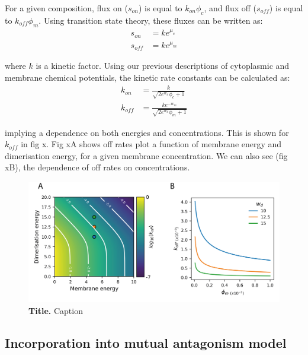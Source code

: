 \documentclass[12pt]{"report"}
\newcommand{\mycaption}[2]{\caption[#1]{\textbf{#1.} #2}}
\begin{document}
\begin{center}
\end{center}

For a given composition, flux on ($s_{on}$) is equal to $k_{on}\phi_c$, and flux off ($s_{off}$) is equal to $k_{off}\phi_m$. Using transition state theory, these fluxes can be written as:
\begin{align}
s_{on} &= ke^{\mu_c}\\
s_{off} &= ke^{\mu_m}
\end{align}

where $k$ is a kinetic factor. Using our previous descriptions of cytoplasmic and membrane chemical potentials, the kinetic rate constants can be calculated as:
\begin{align}
k_{on} &= \frac{k}{\sqrt{2e^{w_d}\phi_c+ 1}}\\
k_{off} &= \frac{ke^{-w_m}}{\sqrt{2e^{w_d}\phi_m+ 1}}
\end{align}

implying a dependence on both energies and concentrations. This is shown for $k_{off}$ in fig x. Fig xA shows off rates plot a function of membrane energy and dimerisation energy, for a given membrane concentration. We can also see (fig xB), the dependence of off rates on concentrations.

\begin{figure}[!h]
\includegraphics[scale=1]{thermodynamic_model_koff}
\setlength{\abovecaptionskip}{20pt}
\centering
\mycaption{Title}{Caption}
\label{fig:thermodynamic_model_koff}
\end{figure}

\subsection{Incorporation into mutual antagonism model}


\clearpage
\end{document}
